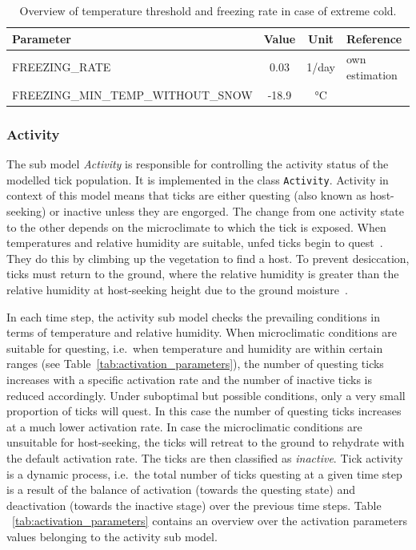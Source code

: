 \documentclass[a4paper, 11pt]{scrartcl}
\newcommand{\inlinecode}[1]{\texttt{\small #1}}
\begin{document}
\begin{table}[h!]
\caption[Overview of temperature threshold and freezing rate.]{Overview of temperature threshold and freezing rate in case of extreme cold.}
\label{tab:freezing_parameters}
\begin{tabularx}{\textwidth}{lccl}
\toprule
\textbf{Parameter}								& \textbf{Value} & \textbf{Unit}	& \textbf{Reference}  		\\
\midrule
\small{FREEZING\_RATE}		    			 	&   0.03    	& 1/day & own estimation 	\\
\small{FREEZING\_MIN\_TEMP\_WITHOUT\_SNOW}	   	&   -18.9    	& °C &  ~\textcite{Gray.2009} \\
\bottomrule
\end{tabularx}
\end{table}

\subsubsection{Activity}
The sub model \emph{Activity} is responsible for controlling the activity status of the modelled tick population. It is implemented in the class \inlinecode{Activity}. Activity in context of this model means that ticks are either questing (also known as host-seeking) or inactive unless they are engorged. The change from one activity state to the other depends on the microclimate to which the tick is exposed. When temperatures and relative humidity are suitable, unfed ticks begin to quest~\parencite{Perret.2000}. They do this by climbing up the vegetation to find a host. To prevent desiccation, ticks must return to the ground, where the relative humidity is greater than the relative humidity at host-seeking height due to the ground moisture~\parencite{Randolph.2004}.

In each time step, the activity sub model checks the prevailing conditions in terms of temperature and relative humidity. When microclimatic conditions are suitable for questing, i.e.\ when temperature and humidity are within certain ranges (see Table~\ref{tab:activation_parameters}), the number of questing ticks increases with a specific activation rate and the number of inactive ticks is reduced accordingly. Under suboptimal but possible conditions, only a very small proportion of ticks will quest. In this case the number of questing ticks increases at a much lower activation rate. In case the microclimatic conditions are unsuitable for host-seeking, the ticks will retreat to the ground to rehydrate with the default activation rate. The ticks are then classified as \emph{inactive}. Tick activity is a dynamic process, i.e.\ the total number of ticks questing at a given time step is a result of the balance of activation (towards the questing state) and deactivation (towards the inactive stage) over the previous time steps. Table ~\ref{tab:activation_parameters} contains an overview over the activation parameters values belonging to the activity sub model.
\end{document}
